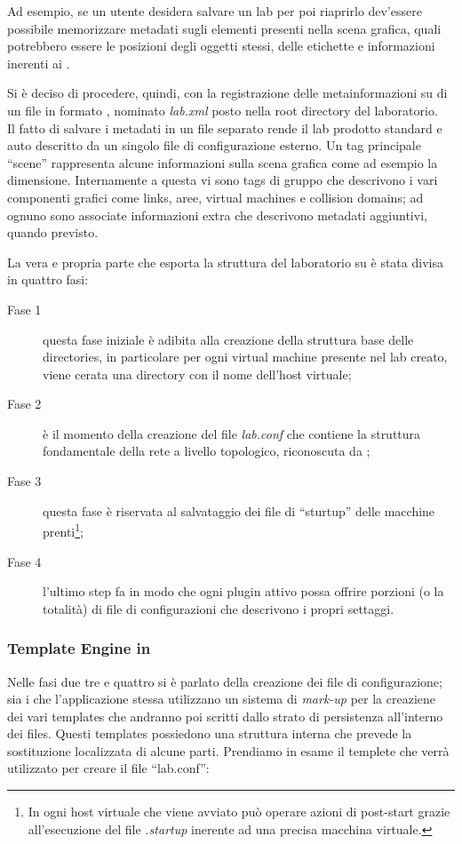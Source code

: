 Ad esempio, se un utente desidera salvare un lab per poi riaprirlo dev'essere possibile memorizzare metadati sugli elementi presenti nella scena grafica, quali potrebbero essere le posizioni degli oggetti stessi, delle etichette e informazioni inerenti ai \plugin{}.

Si è deciso di procedere, quindi, con la registrazione delle metainformazioni su di un file in formato \xml{}, nominato \emph{lab.xml} posto nella root directory del laboratorio.\\
Il fatto di salvare i metadati in un file separato rende il lab prodotto standard e auto descritto da un singolo file di configurazione esterno.
Un tag principale ``scene'' rappresenta alcune informazioni sulla scena grafica come ad esempio la dimensione. Internamente a questa vi sono tags di gruppo che descrivono i vari componenti grafici come links, aree, virtual machines e collision domains; ad ognuno sono associate informazioni extra che descrivono metadati aggiuntivi, quando previsto.

La vera e propria parte che esporta la struttura del laboratorio su \fs{} è stata divisa in quattro fasi:
\begin{description}
\item[Fase 1] questa fase iniziale è adibita alla creazione della struttura base delle directories, in particolare per ogni virtual machine presente nel lab creato, viene cerata una directory con il nome dell'host virtuale;
\item[Fase 2] è il momento della creazione del file \emph{lab.conf} che contiene la struttura fondamentale della rete a livello topologico, riconoscuta da \netkit{};
\item[Fase 3] questa fase è riservata al salvataggio dei file di ``sturtup'' delle macchine prenti\footnote{In \netkit{} ogni host virtuale che viene avviato può operare azioni di post-start grazie all'esecuzione del file \emph{.startup} inerente ad una precisa macchina virtuale.};
\item[Fase 4] l'ultimo step fa in modo che ogni plugin attivo possa offrire porzioni (o la totalità) di file di configurazioni che descrivono i propri settaggi.
\end{description}

\subsubsection*{Template Engine in \visualnetkit{}}
Nelle fasi due tre e quattro si è parlato della creazione dei file di configurazione; sia i \plugin{} che l'applicazione stessa utilizzano un sistema di \emph{mark-up} per la creaziene dei vari templates che andranno poi scritti dallo strato di persistenza all'interno dei files. Questi templates possiedono una struttura interna che prevede la sostituzione localizzata di alcune parti. Prendiamo in esame il templete che verrà utilizzato per creare il file ``lab.conf'':


